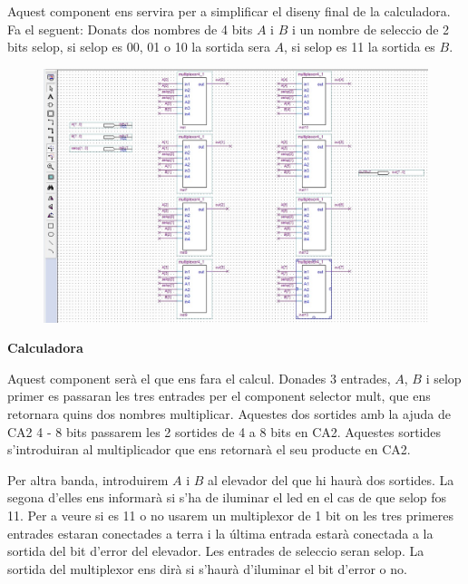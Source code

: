\documentclass[12pt, a4papre]{article}
\begin{document}
\begin{center}
	Aquest component ens servira per a simplificar el diseny final de la calculadora. Fa el seguent: Donats dos nombres de 4 bits $A$ i $B$ i un nombre de seleccio de 2 bits selop, si selop es 00, 01 o 10 la sortida sera $A$, si selop es 11 la sortida es $B$.
	
	\begin{center}
	\begin{figure}[H]
		\begin{center}
		\includegraphics[width=150mm]{multiplexor2x1entrades4bits.jpeg}
		\end{center}
	\end{figure}
	\end{center}
	
	\textbf{\large{Calculadora}}
	
	Aquest component serà el que ens fara el calcul. Donades 3 entrades, $A$, $B$ i selop primer es passaran les tres entrades per el component selector mult, que ens retornara quins dos nombres multiplicar. Aquestes dos sortides amb la ajuda de CA2 4 - 8 bits passarem les 2 sortides de 4 a 8 bits en CA2. Aquestes sortides s'introduiran al multiplicador que ens retornarà el seu producte en CA2. 
	
	Per altra banda, introduirem $A$ i $B$ al elevador del que hi haurà dos sortides. La segona d'elles ens informarà si s'ha de iluminar el led en el cas de que selop fos 11. Per a veure si es 11 o no usarem un multiplexor de 1 bit on les tres primeres entrades estaran conectades a terra i la última entrada estarà conectada a la sortida del bit d'error del elevador. Les entrades de seleccio seran selop. La sortida del multiplexor ens dirà si s'haurà d'iluminar el bit d'error o no.
	

\end{center}
\end{document}
